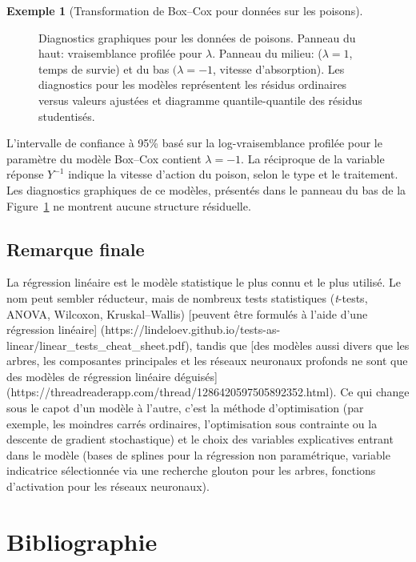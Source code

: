 \documentclass[
  11pt,
  letterpaper,
]{scrbook}
\theoremstyle{definition}
\theoremstyle{plain}
\theoremstyle{definition}
\newtheorem{example}{Exemple}[chapter]
\theoremstyle{plain}
\theoremstyle{remark}
\begin{document}
\begin{example}[Transformation de Box--Cox pour données sur les
poisons]
\begin{figure}[ht!]
{}

\caption{\label{fig-poisonplots}Diagnostics graphiques pour les données
de poisons. Panneau du haut: vraisemblance profilée pour \(\lambda\).
Panneau du milieu: (\(\lambda=1\), temps de survie) et du bas
\((\lambda=-1\), vitesse d'absorption). Les diagnostics pour les modèles
représentent les résidus ordinaires versus valeurs ajustées et diagramme
quantile-quantile des résidus studentisés.}

\end{figure}%

L'intervalle de confiance à 95\% basé sur la log-vraisemblance profilée
pour le paramètre du modèle Box--Cox contient \(\lambda=-1\). La
réciproque de la variable réponse \(Y^{-1}\) indique la vitesse d'action
du poison, selon le type et le traitement. Les diagnostics graphiques de
ce modèles, présentés dans le panneau du bas de la
Figure~\ref{fig-poisonplots} ne montrent aucune structure résiduelle.

\end{example}

\section{Remarque finale}\label{remarque-finale}

La régression linéaire est le modèle statistique le plus connu et le
plus utilisé. Le nom peut sembler réducteur, mais de nombreux tests
statistiques (\emph{t}-tests, ANOVA, Wilcoxon, Kruskal--Wallis)
{[}peuvent être formulés à l'aide d'une régression linéaire{]}
(https://lindeloev.github.io/tests-as-linear/linear\_tests\_cheat\_sheet.pdf),
tandis que {[}des modèles aussi divers que les arbres, les composantes
principales et les réseaux neuronaux profonds ne sont que des modèles de
régression linéaire déguisés{]}
(https://threadreaderapp.com/thread/1286420597505892352.html). Ce qui
change sous le capot d'un modèle à l'autre, c'est la méthode
d'optimisation (par exemple, les moindres carrés ordinaires,
l'optimisation sous contrainte ou la descente de gradient stochastique)
et le choix des variables explicatives entrant dans le modèle (bases de
splines pour la régression non paramétrique, variable indicatrice
sélectionnée via une recherche glouton pour les arbres, fonctions
d'activation pour les réseaux neuronaux).


\chapter*{Bibliographie}\label{bibliographie}
\end{document}
